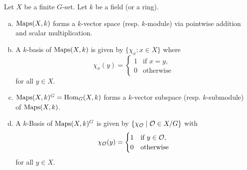 \begin{lem}\label{lem: basis of Maps and Hom}
 Let $X$ be a finite $G$-set. Let $k$ be a field (or a ring).
 \begin{enumerate}[a)]
  \item
   $\operatorname{Maps}(X,k)$ forms a $k$-vector space (resp. $k$-module) via pointwise addition and scalar multiplication.
  \item
   A $k$-basis of $\operatorname{Maps}(X,k)$ is given by $\{\chi_x : x \in X\}$ where
   \[
    \chi_x(y) =
    \begin{cases}
     1 & \text{if } x=y, \\
     0 & \text{otherwise}
    \end{cases}
   \]
   for all $y \in X$.
  \item
   $\operatorname{Maps}(X,k)^G = \operatorname{Hom}_G(X,k)$ forms a $k$-vector subspace (resp. $k$-submodule) of $\operatorname{Maps}(X,k)$.
  \item
   A $k$-Basis of $\operatorname{Maps}(X,k)^G$ is given by $\{\chi_\mathcal{O} \mid \mathcal{O} \in X/G\}$ with
   \[
    \chi_\mathcal{O}(y) =
    \begin{cases}
     1 & \text{if } y \in \mathcal{O}, \\
     0 & \text{otherwise}
    \end{cases}
   \]
   for all $y \in X$.
 \end{enumerate}
\end{lem}
